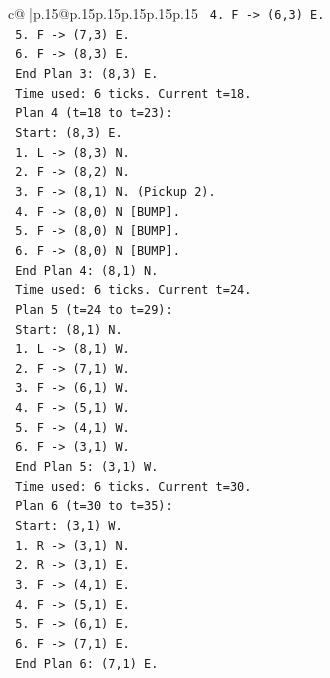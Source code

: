 \documentclass{article}
\begin{document}
{\begin{supertabular}{c@{$\;$}|p{.15\linewidth}@{}p{.15\linewidth}p{.15\linewidth}p{.15\linewidth}p{.15\linewidth}p{.15\linewidth}}
{{{\texttt{   4. F {-}> (6,3) E.} \\
\texttt{   5. F {-}> (7,3) E.} \\
\texttt{   6. F {-}> (8,3) E.} \\
\texttt{   End Plan 3: (8,3) E.} \\
\texttt{   Time used: 6 ticks. Current t=18.} \\
\texttt{   Plan 4 (t=18 to t=23):} \\
\texttt{   Start: (8,3) E.} \\
\texttt{   1. L {-}> (8,3) N.} \\
\texttt{   2. F {-}> (8,2) N.} \\
\texttt{   3. F {-}> (8,1) N. (Pickup 2).} \\
\texttt{   4. F {-}> (8,0) N {[}BUMP{]}.} \\
\texttt{   5. F {-}> (8,0) N {[}BUMP{]}.} \\
\texttt{   6. F {-}> (8,0) N {[}BUMP{]}.} \\
\texttt{   End Plan 4: (8,1) N.} \\
\texttt{   Time used: 6 ticks. Current t=24.} \\
\texttt{   Plan 5 (t=24 to t=29):} \\
\texttt{   Start: (8,1) N.} \\
\texttt{   1. L {-}> (8,1) W.} \\
\texttt{   2. F {-}> (7,1) W.} \\
\texttt{   3. F {-}> (6,1) W.} \\
\texttt{   4. F {-}> (5,1) W.} \\
\texttt{   5. F {-}> (4,1) W.} \\
\texttt{   6. F {-}> (3,1) W.} \\
\texttt{   End Plan 5: (3,1) W.} \\
\texttt{   Time used: 6 ticks. Current t=30.} \\
\texttt{   Plan 6 (t=30 to t=35):} \\
\texttt{   Start: (3,1) W.} \\
\texttt{   1. R {-}> (3,1) N.} \\
\texttt{   2. R {-}> (3,1) E.} \\
\texttt{   3. F {-}> (4,1) E.} \\
\texttt{   4. F {-}> (5,1) E.} \\
\texttt{   5. F {-}> (6,1) E.} \\
\texttt{   6. F {-}> (7,1) E.} \\
\texttt{   End Plan 6: (7,1) E.} \\
}}}
\end{supertabular}}
\end{document}
